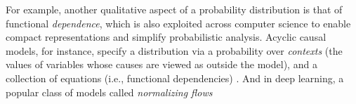 For example, another qualitative aspect of a probability distribution is that of
functional \emph{dependence}, 
    which is also exploited across computer science to enable compact representations and simplify probabilistic 
    analysis.
%
Acyclic causal models, for instance, specify a distribution  via a
probability over \emph{contexts}
(the values of variables whose causes are viewed as outside the model),
and a collection of equations (i.e., functional dependencies) \citep{pearl:2k}.
And in deep learning, a popular class of models called 
    \emph{normalizing flows}
    \citep{tabak2010density,Kobyzev_2021}
